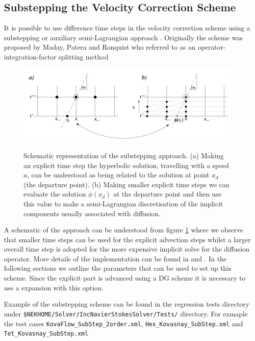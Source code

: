 \subsection{Substepping the Velocity Correction Scheme}

It is possible to use difference time steps in the velocity correction
scheme using a substepping \cite{Sh03} or auxiliary semi-Lagrangian
approach \cite{XiShDoKa}. Originally the scheme was proposed by Maday,
Patera and Ronquist who referred to as an operator-integration-factor splitting method \cite{MaPaRo}

\begin{figure}[!htbp]
\label{fig.substep}
  \centering
 {\includegraphics[width=1 \textwidth]{img/substepimage.png}}
   \caption {Schematic representation of the substepping approach. (a)
     Making an explicit time step the hyperbolic solution, travelling
     with a speed $a$, can be understood as being related to the
     solution at point $x_d$ (the departure point). (b) Making smaller
     explicit time steps we can evaluate the solution $\phi(x_d)$ at
     the departure point and then use this value to make a
     semi-Lagrangian discretisation of the implicit components usually
     associated with diffusion.}
\end{figure}


A schematic of the approach can be understood from figure
\ref{fig.substep} where we observe that smaller time steps can be used
for the explicit advection steps whilst a larger overall time step is
adopted for the more expensive implicit solve for the diffusion
operator. More details of the implementation can be found in
\cite{XiShDoKa} and \cite{Sh03}. In the following sections we outline
the parameters that can be used to set up this scheme. Since the
explicit part is advanced using a DG scheme it is necessary to use a
 expansion with this option.

\begin{notebox}
Example of the substepping scheme can be found in the regression tests
directory under
\texttt{\${NEKHOME}/Solver/IncNavierStokesSolver/Tests/} directory. For
exmaple the test cases \texttt{KovaFlow\_SubStep\_2order.xml},
\texttt{Hex\_Kovasnay\_SubStep.xml} and
\texttt{Tet\_Kovasnay\_SubStep.xml}
\end{notebox}

